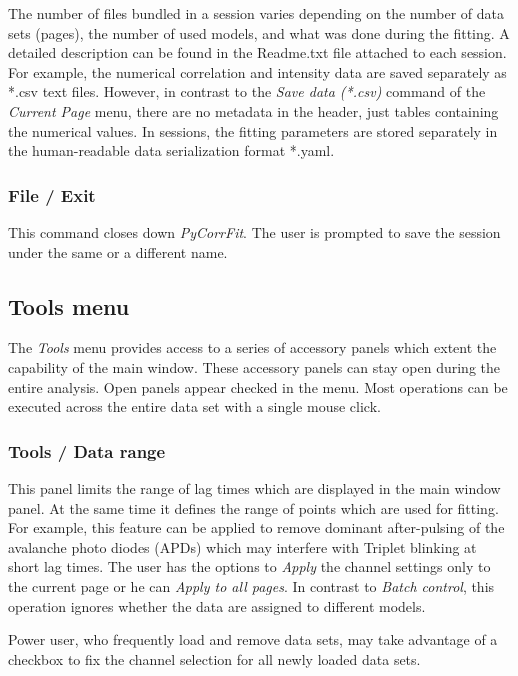 The number of files bundled in a session varies depending on the number of data sets (pages), the number of used models, and what was done during the fitting. A detailed description can be found in the Readme.txt file attached to each session. For example, the numerical correlation and intensity data are saved separately as *.csv text files. However, in contrast to the \textit{Save data (*.csv)} command of the \textit{Current Page} menu, there are no metadata in the header, just tables containing the numerical values. In sessions, the fitting parameters are stored separately in the human-readable data serialization format *.yaml.

\subsubsection{File / Exit}
\label{sec:menub.filem.exit}
This command closes down \textit{PyCorrFit}. The user is prompted to save the session under the same or a different name.

\subsection{Tools menu}
\label{sec:menub.tools}
The \textit{Tools} menu provides access to a series of accessory panels which extent the capability of the main window. These accessory panels can stay open during the entire analysis. Open panels appear checked in the menu. Most operations can be executed across the entire data set with a single mouse click. 

\subsubsection{Tools / Data range}
\label{sec:menub.tools.datar}
This panel limits the range of lag times which are displayed in the main window panel. At the same time it defines the range of points which are used for fitting. For example, this feature can be applied to remove dominant after-pulsing of the avalanche photo diodes (APDs) which may interfere with Triplet blinking at short lag times. The user has the options to \textit{Apply} the channel settings only to the current page or he can \textit{Apply to all pages}. In contrast to \textit{Batch control}, this operation ignores whether the data are assigned to different models. 

Power user, who frequently load and remove data sets, may take advantage of a checkbox to fix the channel selection for all newly loaded data sets.

